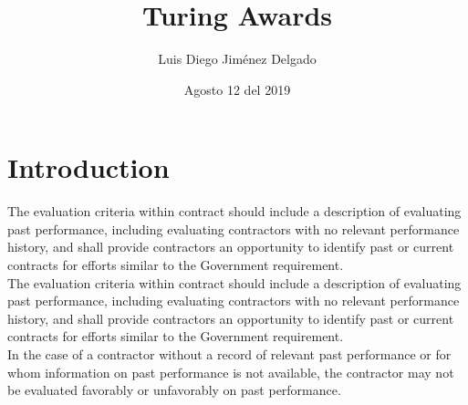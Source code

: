 \documentclass[12pt]{article}
\title{Turing Awards}
\author{Luis Diego Jiménez Delgado}
\date{Agosto 12 del 2019}
\begin{document}

\section{Introduction}
The evaluation criteria within contract should include a description of evaluating past performance, including evaluating contractors with no relevant performance history, and shall provide contractors an opportunity to identify past or current contracts for efforts similar to the Government requirement.\\The evaluation criteria within contract should include a description of evaluating past performance, including evaluating contractors with no relevant performance history, and shall provide contractors an opportunity to identify past or current contracts for efforts similar to the Government requirement.\\In the case of a contractor without a record of relevant past performance or for whom information on past performance is not available, the contractor may not be evaluated favorably or unfavorably on past performance.
\end{document}
